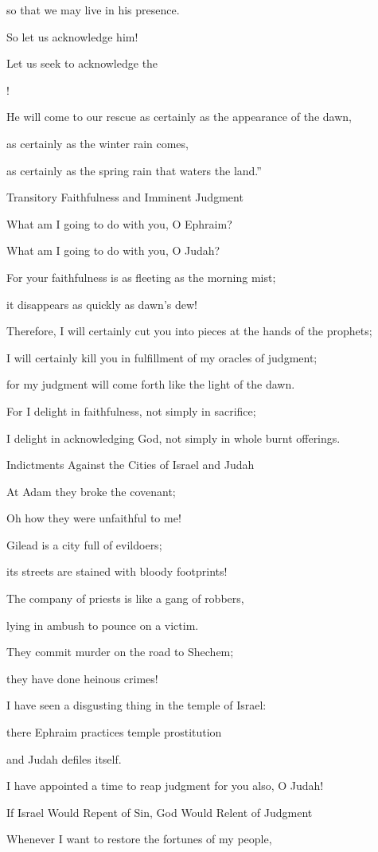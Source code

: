 {\par }{\Q so that we may live
in his presence.
\par }{\Q {}So let us acknowledge
him!

\par }{\Q Let us seek to acknowledge
the

{}!
\par }{\Q He will come to our rescue as certainly as the appearance of the dawn,
\par }{\Q as certainly
as the winter rain
comes,
\par }{\Q as certainly as the spring rain
that waters
the land.”
\par }{\SH Transitory Faithfulness and Imminent Judgment
\par }{\Q {}What
am I going to do
with you, O Ephraim?
\par }{\Q What
am I going to do
with you, O Judah?
\par }{\Q For your faithfulness
is as fleeting as the morning
mist;
\par }{\Q it disappears
as quickly
as dawn’s
dew!
\par }{\Q {}Therefore,
I will certainly cut you into pieces
at the hands of the prophets;
\par }{\Q I will certainly kill
you in fulfillment
of my oracles
of judgment;
\par }{\Q for my judgment will come forth
like the light of the dawn.
\par }{\Q {}For
I delight
in faithfulness,
not
simply in sacrifice;
\par }{\Q I delight in acknowledging
God,
not simply in whole burnt offerings.
\par }{\SH Indictments Against the Cities of Israel and Judah
\par }{\Q {}At Adam
they
broke
the covenant;
\par }{\Q Oh how they were unfaithful to me!
\par }{\Q {}Gilead
is a city
full of evildoers;
\par }{\Q its streets are stained
with bloody footprints!
\par }{\Q {}The company
of priests
is like a gang
of robbers,
\par }{\Q lying
in ambush
to pounce on
a victim.
\par }{\Q They commit murder
on
the road
to Shechem;
\par }{\Q they have
done
heinous crimes!
\par }{\Q {}I have seen
a disgusting thing
in the temple
of Israel:
\par }{\Q there
Ephraim
practices temple prostitution
\par }{\Q and Judah
defiles itself.
\par }{\Q {}I have appointed
a time
to reap judgment for you also,
O Judah!
\par }{\SH If Israel Would Repent of Sin, God Would Relent of Judgment
\par }{\Q Whenever I want to restore the fortunes of my people,

}
